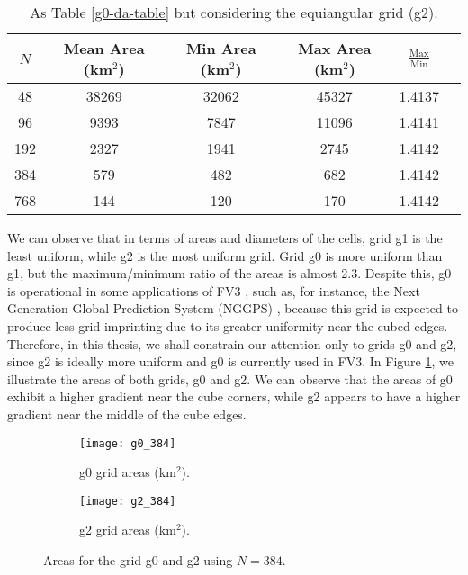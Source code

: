 \begin{table}[htbp]
    \centering
    \caption{As Table \ref{g0-da-table} but considering the equiangular grid (g2). \label{g2-da-table}}
    \begin{tabular}{cccccc}
        \toprule
        $N$ & Mean Area (km$^2$) & Min Area (km$^2$) & Max Area (km$^2$) & $\frac{\text{Max}}{\text{Min}}$ \\
        \midrule
        48 & 38269 & 32062 & 45327 & 1.4137 \\
        96 & 9393 & 7847 & 11096 & 1.4141 \\
        192 & 2327 & 1941 & 2745 & 1.4142 \\
        384 & 579 & 482 & 682 & 1.4142 \\
        768 & 144 & 120 & 170 & 1.4142 \\
        \bottomrule
    \end{tabular}
\end{table}


We can observe that in terms of areas and diameters of the cells, grid g1 is the least uniform,
while g2 is the most uniform grid.
Grid g0 is more uniform than g1, but the maximum/minimum ratio of the areas is almost 2.3. 
Despite this, g0 is operational in some applications of FV3 \citep{harris:2021,chen:2021}, such as, for instance, 
the Next Generation Global Prediction System (NGGPS) \citep{zhou:2019}, 
because this grid is expected to produce less grid imprinting due to its greater uniformity near the cubed edges.
Therefore, in this thesis, we shall constrain our attention only to grids g0 and g2, since g2 is ideally more uniform and g0 is currently used in FV3.
In Figure \ref{chp-cs-areas}, we illustrate the areas of both grids, g0 and g2.
We can observe that the areas of g0 exhibit a higher gradient near the cube corners, while g2 appears to have a higher gradient near the middle of the cube edges.
\begin{figure}[!htb]
	\centering
	\begin{subfigure}{0.48\textwidth}
		\texttt{[image: g0\_384]}
		\caption{g0 grid areas (km$^2$).}
	\end{subfigure}
	\begin{subfigure}{0.48\textwidth}
		\centering
		\texttt{[image: g2\_384]}
		\caption{g2 grid areas (km$^2$).}
	\end{subfigure}
	\caption{Areas for the grid g0 and g2 using $N=384$.\label{chp-cs-areas}}
\end{figure}

